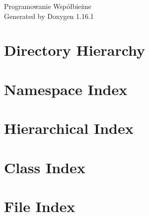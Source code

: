 \documentclass[twoside]{book}
\newcommand{\+}{\discretionary{\mbox{\scriptsize$\hookleftarrow$}}{}{}}
\newcommand{\clearemptydoublepage}{%
    \newpage{\pagestyle{empty}\cleardoublepage}%
  }
\begin{document}
  \raggedbottom
    \hypersetup{pageanchor=false,
                bookmarksnumbered=true,
                pdfencoding=unicode
               }
  \begin{titlepage}
  \vspace*{7cm}
  \begin{center}%
  {\Large Programowanie Współbieżne}\\
  \vspace*{1cm}
  {\large Generated by Doxygen 1.16.1}\\
  \end{center}
  \end{titlepage}
  \clearemptydoublepage
  \tableofcontents
  \clearemptydoublepage
  \hypersetup{pageanchor=true}

\chapter{Directory Hierarchy}

\chapter{Namespace Index}

\chapter{Hierarchical Index}

\chapter{Class Index}

\chapter{File Index}

\end{document}
